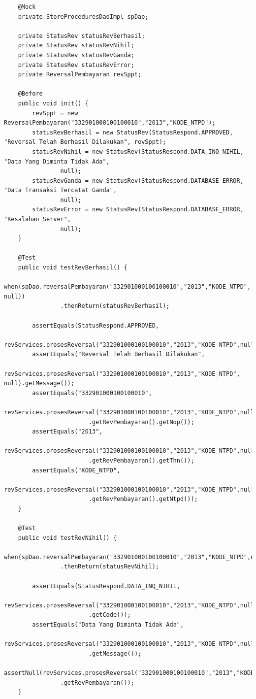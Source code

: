 \documentclass[pdftex,12pt, oneside]{article}
\begin{document}
\begin{enumerate}[A.]
\begin{enumerate}[1.]
\begin{lstlisting}
    @Mock
    private StoreProceduresDaoImpl spDao;

    private StatusRev statusRevBerhasil;
    private StatusRev statusRevNihil;
    private StatusRev statusRevGanda;
    private StatusRev statusRevError;
    private ReversalPembayaran revSppt;

    @Before
    public void init() {
        revSppt = new ReversalPembayaran("332901000100100010","2013","KODE_NTPD");
        statusRevBerhasil = new StatusRev(StatusRespond.APPROVED, "Reversal Telah Berhasil Dilakukan", revSppt);
        statusRevNihil = new StatusRev(StatusRespond.DATA_INQ_NIHIL, "Data Yang Diminta Tidak Ada",
                null);
        statusRevGanda = new StatusRev(StatusRespond.DATABASE_ERROR, "Data Transaksi Tercatat Ganda",
                null);
        statusRevError = new StatusRev(StatusRespond.DATABASE_ERROR, "Kesalahan Server",
                null);
    }

    @Test
    public void testRevBerhasil() {
        when(spDao.reversalPembayaran("332901000100100010","2013","KODE_NTPD", null))
                .thenReturn(statusRevBerhasil);

        assertEquals(StatusRespond.APPROVED,
                revServices.prosesReversal("332901000100100010","2013","KODE_NTPD",null).getCode());
        assertEquals("Reversal Telah Berhasil Dilakukan",
                revServices.prosesReversal("332901000100100010","2013","KODE_NTPD", null).getMessage());
        assertEquals("332901000100100010",
                revServices.prosesReversal("332901000100100010","2013","KODE_NTPD",null)
                        .getRevPembayaran().getNop());
        assertEquals("2013",
                revServices.prosesReversal("332901000100100010","2013","KODE_NTPD",null)
                        .getRevPembayaran().getThn());
        assertEquals("KODE_NTPD",
                revServices.prosesReversal("332901000100100010","2013","KODE_NTPD",null)
                        .getRevPembayaran().getNtpd());
    }

    @Test
    public void testRevNihil() {
        when(spDao.reversalPembayaran("332901000100100010","2013","KODE_NTPD",null))
                .thenReturn(statusRevNihil);

        assertEquals(StatusRespond.DATA_INQ_NIHIL,
                revServices.prosesReversal("332901000100100010","2013","KODE_NTPD",null)
                        .getCode());
        assertEquals("Data Yang Diminta Tidak Ada",
                revServices.prosesReversal("332901000100100010","2013","KODE_NTPD",null)
                        .getMessage());
        assertNull(revServices.prosesReversal("332901000100100010","2013","KODE_NTPD",null)
                .getRevPembayaran());
    }


\end{lstlisting}
\end{enumerate}
\end{enumerate}
\end{document}
